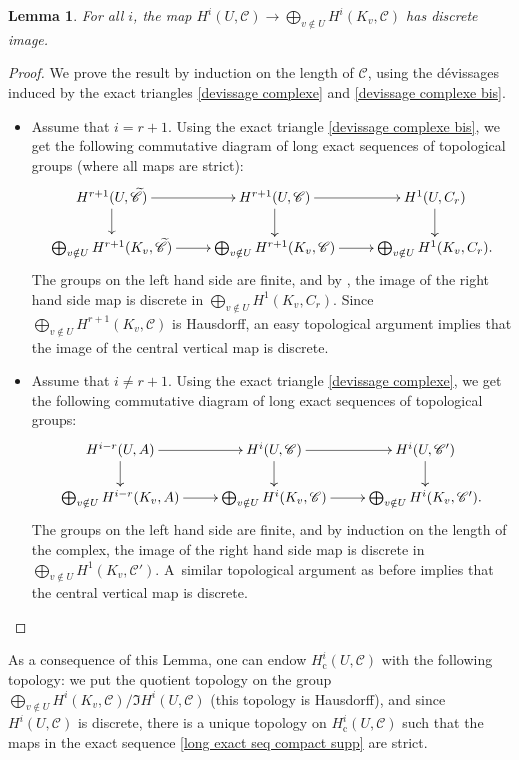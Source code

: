 \documentclass[10pt,a4paper]{amsart}
\let\mathcal\mathscr
\newcommand{\rc}{\mathrm{c}}
\theoremstyle{plain}
\newtheorem{lem}[theo]{Lemma}
\theoremstyle{definition}
\newcommand \cC {\mathcal{C}}
\begin{document}
\begin{lem} \label{closedimagecomplex}
For all $i$, the map $H^i(U, \cC) \to \bigoplus_{v \notin U} H^{i}(K_v,\cC)$ has discrete image.
\end{lem}

\begin{proof}
We prove the result by induction on the length of $\cC$, using the dévissages induced by the exact triangles \eqref{devissage complexe} and \eqref{devissage complexe bis}.
\begin{itemize}
\item Assume that $i = r+1$. Using the exact triangle \eqref{devissage complexe bis}, we get the following commutative diagram of long exact sequences of topological groups (where all maps are strict):\vspace*{-5pt}
\[
\xymatrix@R=6mm{
H^{r+1}(U, \widetilde{\cC}) \ar[r] \ar[d] & H^{r+1}(U, \cC) \ar[r] \ar[d] & H^1(U, C_r) \ar[d] \\
\bigoplus_{v \notin U} H^{r+1}(K_v, \widetilde{\cC}) \ar[r] & \bigoplus_{v \notin U} H^{r+1}(K_v, \cC) \ar[r] & \bigoplus_{v \notin U} H^1(K_v, C_r).
}
\]
The groups on the left hand side are finite, and by \cite[Lem.\,2.7]{cesnalms}, the image of the right hand side map is discrete in $\bigoplus_{v \notin U} H^1(K_v, C_r)$. Since $\bigoplus_{v \notin U} H^{r+1}(K_v, \cC)$ is Hausdorff, an easy topological argument implies that the image of the central vertical map is discrete.
\item Assume that $i \neq r+1$. Using the exact triangle \eqref{devissage complexe}, we get the following commutative diagram of long exact sequences of topological groups:\vspace*{-3pt}
\[
\xymatrix@R=6mm{
H^{i-r}(U, A) \ar[r] \ar[d] & H^{i}(U, \cC) \ar[r] \ar[d] & H^i(U, \cC') \ar[d] \\
\bigoplus_{v \notin U} H^{i-r}(K_v, A) \ar[r] & \bigoplus_{v \notin U} H^{i}(K_v, \cC) \ar[r] & \bigoplus_{v \notin U} H^i(K_v, \cC').
}
\]
The groups on the left hand side are finite, and by induction on the length of the complex, the image of the right hand side map is discrete in $\bigoplus_{v \notin U} H^1(K_v, \cC')$. A~similar topological argument as before implies that the central vertical map is discrete.\qedhere
\end{itemize}
\end{proof}

As a consequence of this Lemma, one can endow $H^i_\rc(U, \cC)$ with the following topology: we put the quotient topology on the group $\bigoplus_{v \notin U} H^{i}(K_v,\cC) / \Im H^i(U, \cC)$ (this topology is Hausdorff),
and since $H^i(U, \cC)$ is discrete, there is a unique topology on $H^i_\rc(U, \cC)$ such that the maps in the exact sequence \eqref{long exact seq compact supp} are strict.
\end{document}
